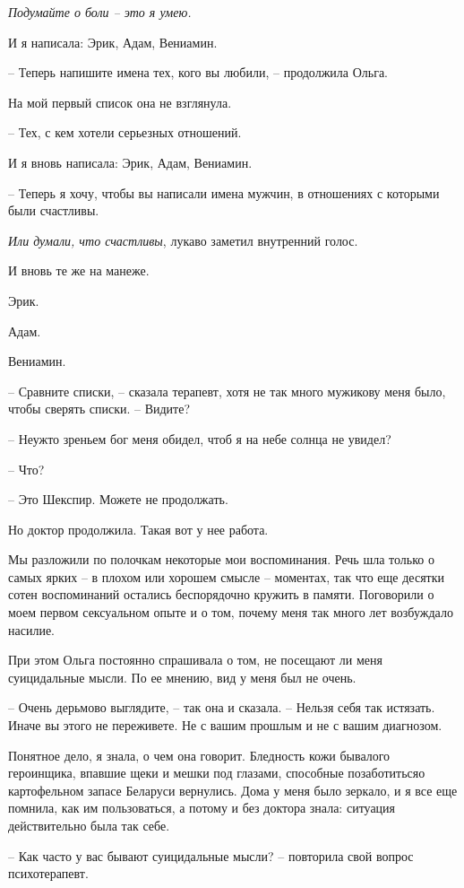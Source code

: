 \documentclass[
]{book}
\begin{document}
\emph{Подумайте о боли -- это я умею.}

И я написала: Эрик, Адам, Вениамин.

-- Теперь напишите имена тех, кого вы любили, -- продолжила Ольга.

На мой первый список она не взглянула.

-- Тех, с кем хотели серьезных отношений.

И я вновь написала: Эрик, Адам, Вениамин.

-- Теперь я хочу, чтобы вы написали имена мужчин, в отношениях с которыми были счастливы.

\emph{Или думали, что счастливы}, лукаво заметил внутренний голос.

И вновь те же на манеже.

Эрик.

Адам.

Вениамин.

-- Сравните списки, -- сказала терапевт, хотя не так много мужикову меня было, чтобы сверять списки. -- Видите?

-- Неужто зреньем бог меня обидел, чтоб я на небе солнца не увидел?

-- Что?

-- Это Шекспир. Можете не продолжать.

Но доктор продолжила. Такая вот у нее работа.

Мы разложили по полочкам некоторые мои воспоминания. Речь шла только о самых ярких -- в плохом или хорошем смысле -- моментах, так что еще десятки сотен воспоминаний остались беспорядочно кружить в памяти. Поговорили о моем первом сексуальном опыте и о том, почему меня так много лет возбуждало насилие.

При этом Ольга постоянно спрашивала о том, не посещают ли меня суицидальные мысли. По ее мнению, вид у меня был не очень.

-- Очень дерьмово выглядите, -- так она и сказала. -- Нельзя себя так истязать. Иначе вы этого не переживете. Не с вашим прошлым и не с вашим диагнозом.

Понятное дело, я знала, о чем она говорит. Бледность кожи бывалого героинщика, впавшие щеки и мешки под глазами, способные позаботитьсяо картофельном запасе Беларуси вернулись. Дома у меня было зеркало, и я все еще помнила, как им пользоваться, а потому и без доктора знала: ситуация действительно была так себе.

-- Как часто у вас бывают суицидальные мысли? -- повторила свой вопрос психотерапевт.
\end{document}
